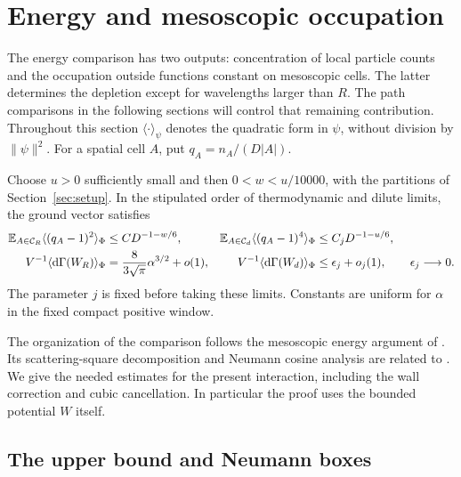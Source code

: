 \section{Energy and mesoscopic occupation}\label{sec:energy}

The energy comparison has two outputs: concentration of local particle
counts and the occupation outside functions constant on mesoscopic cells.
The latter determines the depletion except for wavelengths larger than
$R$.  The path comparisons in the following sections will control that
remaining contribution.  Throughout this section $\langle\cdot\rangle_\psi$
denotes the quadratic form in $\psi$, without division by $\|\psi\|^2$.
For a spatial cell $A$, put $q_A=n_A/(D|A|)$.

\begin{proposition}\label{prop:local-energy}
Choose $u>0$ sufficiently small and then $0<w<u/10000$, with the
partitions of Section~\ref{sec:setup}.  In the stipulated order of
thermodynamic and dilute limits, the ground vector satisfies
\begin{equation}\label{eq:local-energy}
\begin{aligned}
 \mathbb E_{A\in\mathcal C_R}\langle(q_A-1)^2\rangle_\Phi
       &\le CD^{-1-w/6},&
 \mathbb E_{A\in\mathcal C_d}\langle(q_A-1)^4\rangle_\Phi
       &\le C_jD^{-1-u/6},\\
 V^{-1}\langle\mathrm d\Gamma(W_R)\rangle_\Phi
       &=\frac8{3\sqrt\pi}\alpha^{3/2}+o(1),&
 V^{-1}\langle\mathrm d\Gamma(W_d)\rangle_\Phi
       &\le\epsilon_j+o_j(1),\qquad \epsilon_j\longrightarrow0.
\end{aligned}
\end{equation}
The parameter $j$ is fixed before taking these limits.  Constants are
uniform for $\alpha$ in the fixed compact positive window.
\end{proposition}

The organization of the comparison follows the mesoscopic energy
argument of \cite[Section~3]{D}.  Its scattering-square decomposition and
Neumann cosine analysis are related to
\cite[Sections~2 and~5]{FJGMOTr}.  We give the needed estimates for the
present interaction, including the wall correction and cubic cancellation.
In particular the proof uses the bounded potential $W$ itself.

\subsection{The upper bound and Neumann boxes}

